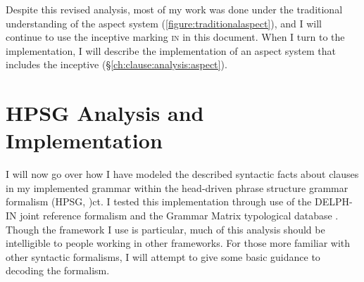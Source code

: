 \begin{comment}
\ex \label{ex:mul1}
\begingl
\glpreamble mułaa //
\gla muł-(y)aˑ //
\glb tide.comes.in-\textsc{cv} //
\glft tide starting to come up (\textbf{T}, Fidelia Haiyupis & \textsc{B}, Bob Mundy) //
\endgl
\xe

\ex \label{ex:mul2}
\begingl
\glpreamble muułšiƛ //
\gla muł-šiƛ-LS(?) //
\glb tide.comes.in-\textsc{mo}-\textsc{gr}(?) //
\glft tide coming in (\textbf{T}, Fidelia Haiyupis & \textsc{B}, Bob Mundy) //
\endgl
\xe

\ex \label{ex:mul3}
\begingl
\glpreamble mułiičiƛ //
\gla muł-a-LS //
\glb tide.comes.in-\textsc{mo}-\textsc{gr} //
\glft tide coming in (\textbf{T}, Fidelia Haiyupis & \textsc{B}, Bob Mundy) //
\endgl
\xe
\end{comment}




Despite this revised analysis, most of my work was done under the traditional understanding of the aspect system (\cref{figure:traditionalaspect}), and I will continue to use the inceptive marking \textsc{in} in this document. When I turn to the implementation, I will describe the implementation of an aspect system that includes the inceptive (\S\ref{ch:clause:analysis:aspect}).

\section{HPSG Analysis and Implementation} \label{ch:clause:analysis}

I will now go over how I have modeled the described syntactic facts about clauses in my implemented grammar within the head-driven phrase structure grammar formalism (HPSG, \citealt{pollardsag1994})ct. I tested this implementation through use of the DELPH-IN joint reference formalism \citep{copestake2002} and the Grammar Matrix typological database \citep{bender2002}. Though the framework I use is particular, much of this analysis should be intelligible to people working in other frameworks. For those more familiar with other syntactic formalisms, I will attempt to give some basic guidance to decoding the formalism.

